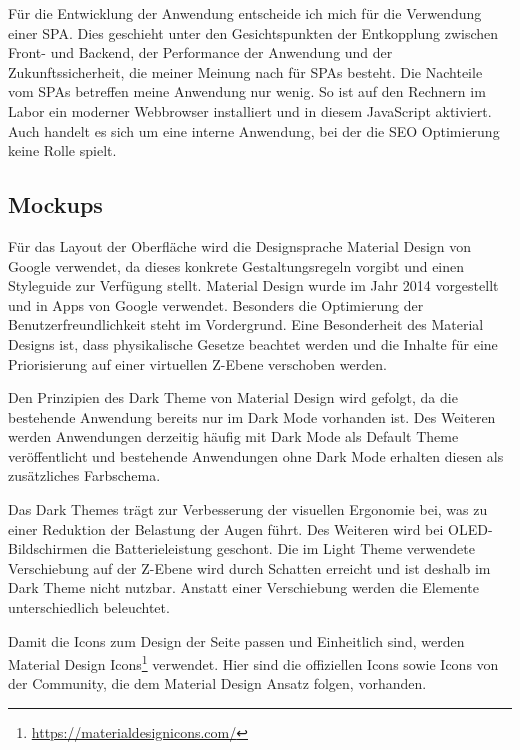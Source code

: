 Für die Entwicklung der Anwendung entscheide ich mich für die Verwendung einer SPA. Dies geschieht unter den Gesichtspunkten der Entkopplung zwischen Front- und Backend, der Performance der Anwendung und der Zukunftssicherheit, die meiner Meinung nach für SPAs besteht. Die Nachteile vom SPAs betreffen meine Anwendung nur wenig. So ist auf den Rechnern im Labor ein moderner Webbrowser installiert und in diesem JavaScript aktiviert. Auch handelt es sich um eine interne Anwendung, bei der die SEO Optimierung keine Rolle spielt. \cite{melnikSinglePageApplication2020}

\subsection{Mockups} \label{subsec:Mockup}

Für das Layout der Oberfläche wird die Designsprache Material Design von Google verwendet, da dieses konkrete Gestaltungsregeln vorgibt und einen Styleguide zur Verfügung stellt. Material Design wurde im Jahr 2014 vorgestellt und in Apps von Google verwendet. Besonders die Optimierung der Benutzerfreundlichkeit steht im Vordergrund. Eine Besonderheit des Material Designs ist, dass physikalische Gesetze beachtet werden und die Inhalte für eine Priorisierung auf einer virtuellen Z-Ebene verschoben werden. \cite{kulturbanause-teamMaterialDesignDesignsprache2017}

Den Prinzipien des Dark Theme von Material Design wird gefolgt, da die bestehende Anwendung bereits nur im Dark Mode vorhanden ist. Des Weiteren werden Anwendungen derzeitig häufig mit Dark Mode als Default Theme veröffentlicht und bestehende Anwendungen ohne Dark Mode erhalten diesen als zusätzliches Farbschema. \cite{colbyWindows10Dark2020}

Das Dark Themes trägt zur Verbesserung der visuellen Ergonomie bei, was zu einer Reduktion der Belastung der Augen führt. Des Weiteren wird bei OLED-Bildschirmen die Batterieleistung geschont. Die im Light Theme verwendete Verschiebung auf der Z-Ebene wird durch Schatten erreicht und ist deshalb im Dark Theme nicht nutzbar. Anstatt einer Verschiebung werden die Elemente unterschiedlich beleuchtet.\cite{googleDarkTheme}

Damit die Icons zum Design der Seite passen und Einheitlich sind, werden Material Design Icons\footnote{\url{https://materialdesignicons.com/}} verwendet. Hier sind die offiziellen Icons sowie Icons von der Community, die dem Material Design Ansatz folgen, vorhanden.

